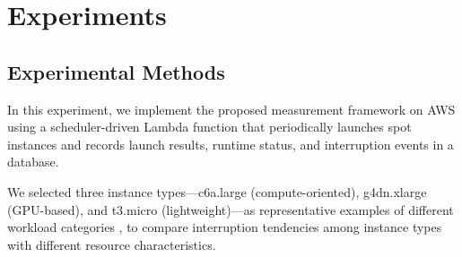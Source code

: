 \documentclass[runningheads]{llncs}
\begin{document}





\section{Experiments}

\subsection{Experimental Methods}

In this experiment, we implement the proposed measurement framework on AWS using a scheduler-driven Lambda function that periodically launches spot instances and records launch results, runtime status, and interruption events in a database.

We selected three instance types—c6a.large (compute-oriented), g4dn.xlarge (GPU-based), and t3.micro (lightweight)—as representative examples of different workload categories \cite{Pham2018,AWSInstanceTypes}, to compare interruption tendencies among instance types with different resource characteristics.
\end{document}
